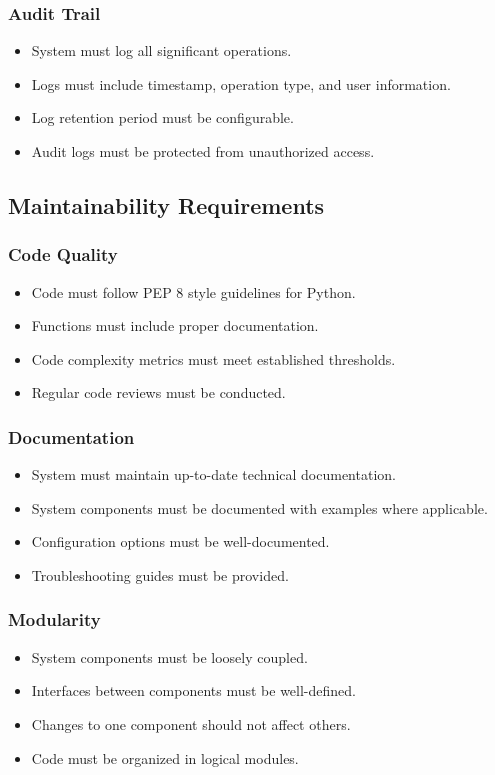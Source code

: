 \documentclass[12pt,a4paper]{report}
\begin{document}
\subsubsection{Audit Trail}
\begin{itemize}
    \item System must log all significant operations.
    \item Logs must include timestamp, operation type, and user information.
    \item Log retention period must be configurable.
    \item Audit logs must be protected from unauthorized access.
\end{itemize}

\subsection{Maintainability Requirements}

\subsubsection{Code Quality}
\begin{itemize}
    \item Code must follow PEP 8 style guidelines for Python.
    \item Functions must include proper documentation.
    \item Code complexity metrics must meet established thresholds.
    \item Regular code reviews must be conducted.
\end{itemize}

\subsubsection{Documentation}
\begin{itemize}
    \item System must maintain up-to-date technical documentation.
    \item System components must be documented with examples where applicable.
    \item Configuration options must be well-documented.
    \item Troubleshooting guides must be provided.
\end{itemize}

\subsubsection{Modularity}
\begin{itemize}
    \item System components must be loosely coupled.
    \item Interfaces between components must be well-defined.
    \item Changes to one component should not affect others.
    \item Code must be organized in logical modules.
\end{itemize}
\end{document}
